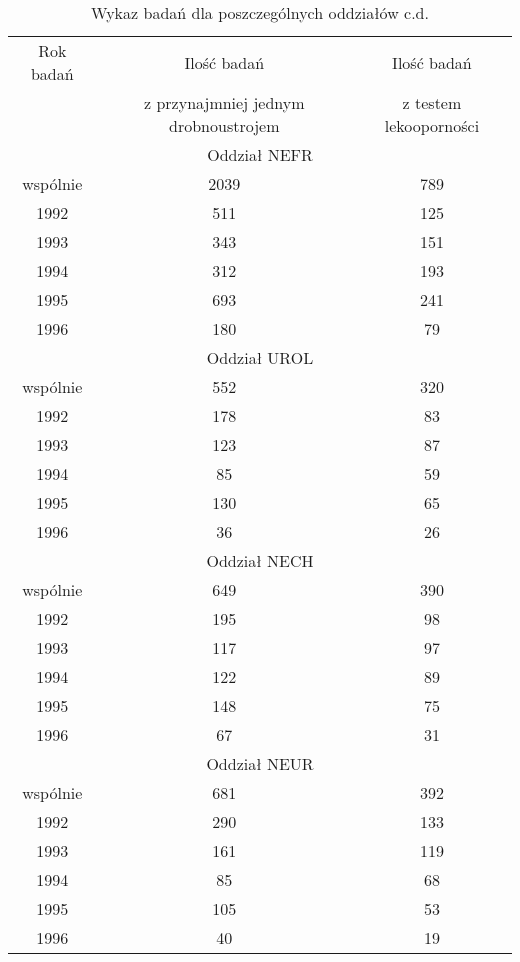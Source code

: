 \documentclass[a4paper,11pt]{article}
\begin{document}
\begin{table}[H]
\begin{center}
\caption{Wykaz badań dla poszczególnych oddziałów c.d.}
\begin{tabular}{c|c|c}
\hline
Rok badań & Ilość badań & Ilość badań \\
& z przynajmniej jednym drobnoustrojem &z testem lekooporności \\

\hline \multicolumn{3}{|c|}{Oddział NEFR} \\ \hline
wspólnie &2039 &789 \\
1992 &511 &125 \\
1993 &343 &151 \\
1994 &312 &193 \\
1995 &693 &241 \\
1996 &180 &79 \\
\hline \multicolumn{3}{|c|}{Oddział UROL} \\ \hline
wspólnie &552 &320 \\
1992 &178 &83 \\
1993 &123 &87 \\
1994 &85 &59 \\
1995 &130 &65 \\
1996 &36 &26 \\
\hline \multicolumn{3}{|c|}{Oddział NECH} \\ \hline
wspólnie &649 &390 \\
1992 &195 &98 \\
1993 &117 &97 \\
1994 &122 &89 \\
1995 &148 &75 \\
1996 &67 &31 \\
\hline \multicolumn{3}{|c|}{Oddział NEUR} \\ \hline
wspólnie &681 &392 \\
1992 &290 &133 \\
1993 &161 &119 \\
1994 &85 &68 \\
1995 &105 &53 \\
1996 &40 &19 \\


\end{tabular}
\end{center}
\end{table}
\end{document}
